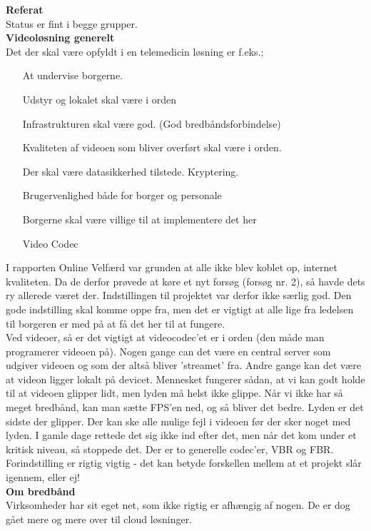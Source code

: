 \textbf{Referat} 
\\
Status er fint i begge grupper.\\
\textbf{Videoløsning generelt}\\
Det der skal være opfyldt i en telemedicin løsning er f.eks.; 
\begin{itemize}
	\item[At undervise borgerne.]
	\item[Udstyr og lokalet skal være i orden]
	\item[Infrastrukturen skal være god. (God bredbåndsforbindelse)]
	\item[Kvaliteten af videoen som bliver overført skal være i orden.]
	\item[Der skal være datasikkerhed tilstede. Kryptering.]
	\item[Brugervenlighed både for borger og personale]
	\item[Borgerne skal være villige til at implementere det her]
	\item[Video Codec]
\end{itemize}
I rapporten Online Velfærd var grunden at alle ikke blev koblet op, internet kvaliteten. Da de derfor prøvede at køre et nyt forsøg (forsøg nr. 2), så havde dets ry allerede været der. Indstillingen til projektet var derfor ikke særlig god. Den gode indstilling skal komme oppe fra, men det er vigtigt at alle lige fra ledelsen til borgeren er med på at få det her til at fungere.\\
Ved videoer, så er det vigtigt at videocodec'et er i orden (den måde man programerer videoen på). Nogen gange can det være en central server som udgiver videoen og som der altså bliver 'streamet' fra. Andre gange kan det være at videon ligger lokalt på devicet. Mennesket fungerer sådan, at vi kan godt holde til at videoen glipper lidt, men lyden må helst ikke glippe. Når vi ikke har så meget bredbånd, kan man sætte FPS'en ned, og så bliver det bedre. Lyden er det sidste der glipper. Der kan ske alle mulige fejl i videoen før der sker noget med lyden. I gamle dage rettede det sig ikke ind efter det, men når det kom under et kritisk niveau, så stoppede det. Der er to generelle codec'er, VBR og FBR. \\
Forindstilling er rigtig vigtig - det kan betyde forskellen mellem at et projekt slår igennem, eller ej! \\
\textbf{Om bredbånd}\\
Virksomheder har sit eget net, som ikke rigtig er afhængig af nogen. De er dog gået mere og mere over til cloud løsninger. 
